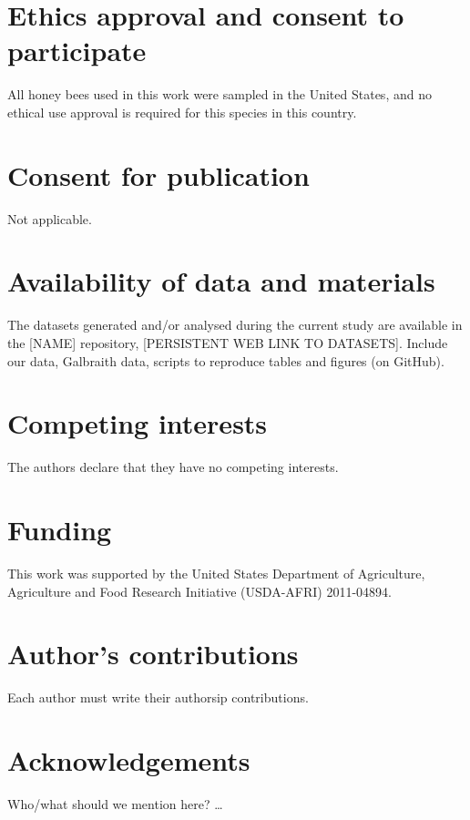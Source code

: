 \documentclass{bmcart}
\begin{document}
\begin{linenumbers}
\begin{backmatter}

\section*{Ethics approval and consent to participate}
  All honey bees used in this work were sampled in the United States, and no ethical use approval is required for this species in this country.

\section*{Consent for publication}
  Not applicable.

\section*{Availability of data and materials}
  The datasets generated and/or analysed during the current study are available in the [NAME] repository, [PERSISTENT WEB LINK TO DATASETS]. Include our data, Galbraith data, scripts to reproduce tables and figures (on GitHub).

\section*{Competing interests}
  The authors declare that they have no competing interests.

\section*{Funding}
  This work was supported by the United States Department of Agriculture, Agriculture and Food Research Initiative (USDA-AFRI) 2011-04894.

\section*{Author's contributions}
  Each author must write their authorsip contributions.
    
\section*{Acknowledgements}
  Who/what should we mention here? \ldots
  

\end{backmatter}
\end{linenumbers}
\end{document}
